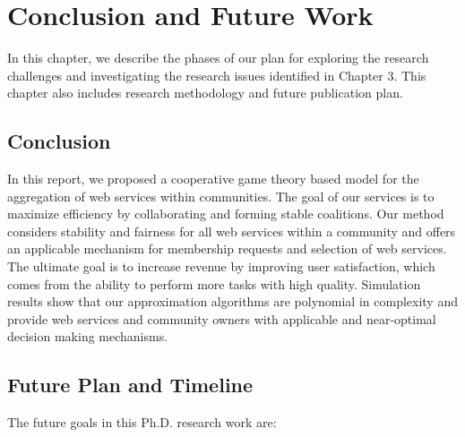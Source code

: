 \setcounter{chapter}{3}
\chapter{Conclusion and Future Work}\label{sec:conclusionfuturework}
In this chapter, we describe the phases of our plan for exploring
the research challenges and investigating the research issues
identified in Chapter 3. This chapter also includes research
methodology and future publication plan.

\section {Conclusion}

In this report, we proposed a cooperative game theory based model for the aggregation of web services within communities.
The goal of our services is to maximize efficiency by collaborating and forming stable
coalitions. Our method considers stability and fairness for all
web services within a community and offers an applicable mechanism
for membership requests and selection of web services. The
ultimate goal is to increase revenue by improving user
satisfaction, which comes from the ability to perform more tasks
with high quality. Simulation results show that our approximation
algorithms are polynomial in complexity and provide web services
and community owners with applicable and near-optimal decision
making mechanisms.


\section {Future Plan and Timeline}

\indent The future goals in this Ph.D. research work are:

